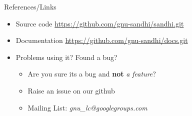 \documentclass{beamer}
\begin{document}

\begin{frame}{References/Links}

\begin{itemize}
  \item Source code \url{https://github.com/gnu-sandhi/sandhi.git}
  \item Documentation \url{https://github.com/gnu-sandhi/docs.git}
  \item Problems using it? Found a bug?
  \begin{itemize}
 	\item Are you sure its a bug and \textbf{not} \textit{a feature}?
	\item Raise an issue on our github
	\item Mailing List: \textit{gnu\_lc@googlegroups.com}
  \end{itemize}
\end{itemize}

\vskip 1cm

\end{frame}
\end{document}
